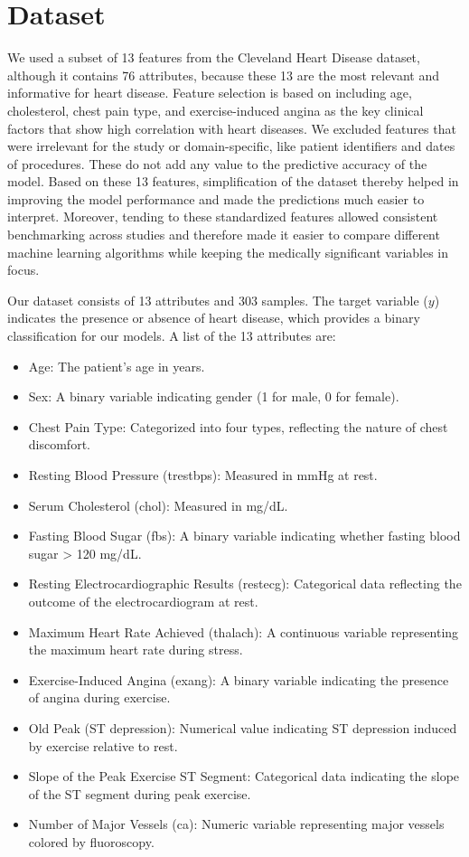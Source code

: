 \section{Dataset}
We used a subset of 13 features from the Cleveland Heart Disease dataset, although it contains 76 attributes, because these 13 are the most relevant and informative for heart disease. Feature selection is based on including age, cholesterol, chest pain type, and exercise-induced angina as the key clinical factors that show high correlation with heart diseases. We excluded features that were irrelevant for the study or domain-specific, like patient identifiers and dates of procedures. These do not add any value to the predictive accuracy of the model. Based on these 13 features, simplification of the dataset thereby helped in improving the model performance and made the predictions much easier to interpret. Moreover, tending to these standardized features allowed consistent benchmarking across studies and therefore made it easier to compare different machine learning algorithms while keeping the medically significant variables in focus.

Our dataset consists of 13 attributes and 303 samples. The target variable ($y$) indicates the presence or absence of heart disease, which provides a binary classification for our models. A list of the 13 attributes are:
\begin{itemize}
    \item Age: The patient’s age in years.
    \item Sex: A binary variable indicating gender (1 for male, 0 for female).
    \item Chest Pain Type: Categorized into four types, reflecting the nature of chest discomfort.
    \item Resting Blood Pressure (trestbps): Measured in mmHg at rest.
    \item Serum Cholesterol (chol): Measured in mg/dL.
    \item Fasting Blood Sugar (fbs): A binary variable indicating whether fasting blood sugar > 120 mg/dL.
    \item Resting Electrocardiographic Results (restecg): Categorical data reflecting the outcome of the electrocardiogram at rest.
    \item Maximum Heart Rate Achieved (thalach): A continuous variable representing the maximum heart rate during stress.
    \item Exercise-Induced Angina (exang): A binary variable indicating the presence of angina during exercise.
    \item Old Peak (ST depression): Numerical value indicating ST depression induced by exercise relative to rest.
    \item Slope of the Peak Exercise ST Segment: Categorical data indicating the slope of the ST segment during peak exercise.
    \item Number of Major Vessels (ca): Numeric variable representing major vessels colored by fluoroscopy.
\end{itemize}   

